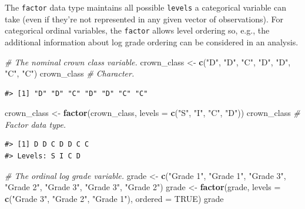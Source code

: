 \documentclass[
  11pt,
]{krantz}
\newenvironment{Shaded}{\begin{snugshade}}{\end{snugshade}}
\newcommand{\CommentTok}[1]{\textcolor[rgb]{0.56,0.35,0.01}{\textit{#1}}}
\newcommand{\DataTypeTok}[1]{\textcolor[rgb]{0.13,0.29,0.53}{#1}}
\newcommand{\KeywordTok}[1]{\textcolor[rgb]{0.13,0.29,0.53}{\textbf{#1}}}
\newcommand{\NormalTok}[1]{#1}
\newcommand{\OtherTok}[1]{\textcolor[rgb]{0.56,0.35,0.01}{#1}}
\newcommand{\StringTok}[1]{\textcolor[rgb]{0.31,0.60,0.02}{#1}}
\theoremstyle{definition}
\theoremstyle{definition}
\theoremstyle{definition}
\theoremstyle{definition}
\theoremstyle{remark}
\begin{document}
The \texttt{factor} data type maintains all possible \texttt{levels} a categorical variable can take (even if they're not represented in any given vector of observations). For categorical ordinal variables, the \texttt{factor} allows level ordering so, e.g., the additional information about log grade ordering can be considered in an analysis.

\begin{Shaded}
\begin{Highlighting}[]
\CommentTok{\# The nominal crown class variable.}
\NormalTok{crown\_class \textless{}{-}}\StringTok{ }\KeywordTok{c}\NormalTok{(}\StringTok{"D"}\NormalTok{, }\StringTok{"D"}\NormalTok{, }\StringTok{"C"}\NormalTok{, }\StringTok{"D"}\NormalTok{, }\StringTok{"D"}\NormalTok{, }\StringTok{"C"}\NormalTok{, }\StringTok{"C"}\NormalTok{)}
\NormalTok{crown\_class }\CommentTok{\# Character.}
\end{Highlighting}
\end{Shaded}

\begin{verbatim}
#> [1] "D" "D" "C" "D" "D" "C" "C"
\end{verbatim}

\begin{Shaded}
\begin{Highlighting}[]
\NormalTok{crown\_class \textless{}{-}}\StringTok{ }\KeywordTok{factor}\NormalTok{(crown\_class, }\DataTypeTok{levels =} \KeywordTok{c}\NormalTok{(}\StringTok{"S"}\NormalTok{, }\StringTok{"I"}\NormalTok{, }\StringTok{"C"}\NormalTok{, }\StringTok{"D"}\NormalTok{))}
\NormalTok{crown\_class }\CommentTok{\# Factor data type.}
\end{Highlighting}
\end{Shaded}

\begin{verbatim}
#> [1] D D C D D C C
#> Levels: S I C D
\end{verbatim}

\begin{Shaded}
\begin{Highlighting}[]
\CommentTok{\# The ordinal log grade variable.}
\NormalTok{grade \textless{}{-}}\StringTok{ }\KeywordTok{c}\NormalTok{(}\StringTok{"Grade 1"}\NormalTok{, }\StringTok{"Grade 1"}\NormalTok{, }\StringTok{"Grade 3"}\NormalTok{, }\StringTok{"Grade 2"}\NormalTok{, }
           \StringTok{"Grade 3"}\NormalTok{, }\StringTok{"Grade 3"}\NormalTok{, }\StringTok{"Grade 2"}\NormalTok{)}
\NormalTok{grade \textless{}{-}}\StringTok{ }\KeywordTok{factor}\NormalTok{(grade, }
                \DataTypeTok{levels =} \KeywordTok{c}\NormalTok{(}\StringTok{"Grade 3"}\NormalTok{, }\StringTok{"Grade 2"}\NormalTok{, }\StringTok{"Grade 1"}\NormalTok{), }
                \DataTypeTok{ordered =} \OtherTok{TRUE}\NormalTok{)}
\NormalTok{grade}
\end{Highlighting}
\end{Shaded}
\end{document}
